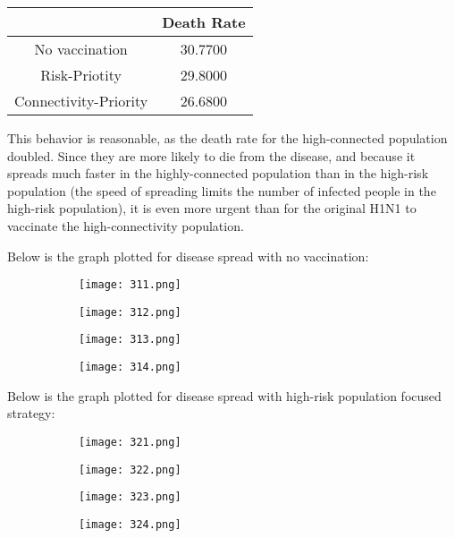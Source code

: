 \documentclass[titlepage]{article}
\begin{document}
\begin{center}
\begin{tabular}{ | c | c | }
\hline
 & Death Rate\\\hline
No vaccination & 30.7700\\\hline
Risk-Priotity & 29.8000\\\hline
Connectivity-Priority & 26.6800\\
\hline
\end{tabular}
\end{center}

This behavior is reasonable, as the death rate for the high-connected population doubled. Since they are more likely to die from the disease, and because it spreads much faster in the highly-connected population than in the high-risk population (the speed of spreading limits the number of infected people in the high-risk population), it is even more urgent than for the original H1N1 to vaccinate the high-connectivity population.

Below is the graph plotted for disease spread with no vaccination:

\begin{figure}[H]
       \centering
       \begin{subfigure}{0.48\textwidth}
       \centering
       \texttt{[image: 311.png]}
       \end{subfigure}\quad
       \begin{subfigure}{0.48\textwidth}
       \centering
       \texttt{[image: 312.png]}
       \end{subfigure}
              \begin{subfigure}{0.48\textwidth}
       \centering
       \texttt{[image: 313.png]}
       \end{subfigure}\quad
       \begin{subfigure}{0.48\textwidth}
       \centering
       \texttt{[image: 314.png]}
       \end{subfigure}
\end{figure}

Below is the graph plotted for disease spread with high-risk population focused strategy:

\begin{figure}[H]
       \centering
       \begin{subfigure}{0.48\textwidth}
       \centering
       \texttt{[image: 321.png]}
       \end{subfigure}\quad
       \begin{subfigure}{0.48\textwidth}
       \centering
       \texttt{[image: 322.png]}
       \end{subfigure}
              \begin{subfigure}{0.48\textwidth}
       \centering
       \texttt{[image: 323.png]}
       \end{subfigure}\quad
       \begin{subfigure}{0.48\textwidth}
       \centering
       \texttt{[image: 324.png]}
       \end{subfigure}
\end{figure}
\end{document}
